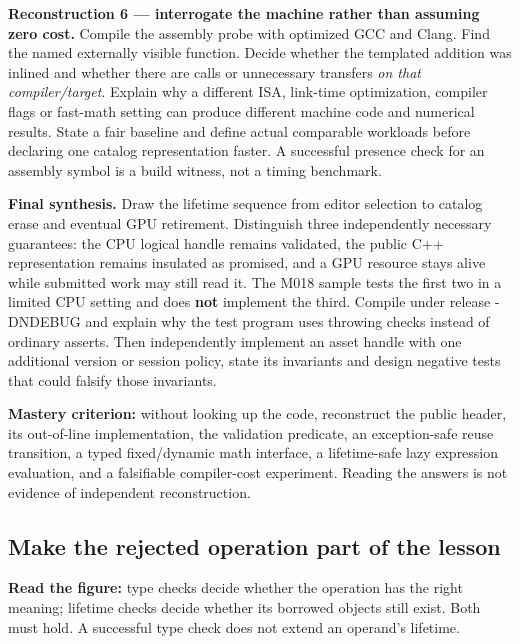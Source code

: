 \textbf{Reconstruction 6 --- interrogate the machine rather than assuming zero cost.} Compile the assembly probe with optimized GCC and Clang. Find the named externally visible function. Decide whether the templated addition was inlined and whether there are calls or unnecessary transfers \emph{on that compiler/target}. Explain why a different ISA, link-time optimization, compiler flags or fast-math setting can produce different machine code and numerical results. State a fair baseline and define actual comparable workloads before declaring one catalog representation faster. A successful presence check for an assembly symbol is a build witness, not a timing benchmark.

\textbf{Final synthesis.} Draw the lifetime sequence from editor selection to catalog erase and eventual GPU retirement. Distinguish three independently necessary guarantees: the CPU logical handle remains validated, the public C++ representation remains insulated as promised, and a GPU resource stays alive while submitted work may still read it. The M018 sample tests the first two in a limited CPU setting and does \textbf{not} implement the third. Compile under release -DNDEBUG and explain why the test program uses throwing checks instead of ordinary asserts. Then independently implement an asset handle with one additional version or session policy, state its invariants and design negative tests that could falsify those invariants.

\textbf{Mastery criterion:} without looking up the code, reconstruct the public header, its out-of-line implementation, the validation predicate, an exception-safe reuse transition, a typed fixed/dynamic math interface, a lifetime-safe lazy expression evaluation, and a falsifiable compiler-cost experiment. Reading the answers is not evidence of independent reconstruction.

\subsection{Make the rejected operation part of the lesson}\label{appendix-960160274237-make-the-rejected-operation-part-of-the-lesson}

\hypertarget{appendix-960160274237-make-the-rejected-operation-part-of-the-lesson}{}


\textbf{Read the figure:} type checks decide whether the operation has the right meaning; lifetime checks decide whether its borrowed objects still exist. Both must hold. A successful type check does not extend an operand's lifetime.

